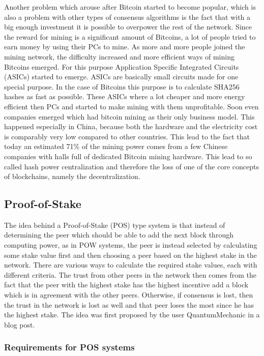 Another problem which arouse after Bitcoin started to become popular, which is also a problem with other types of consensus algorithms is the fact that with a big enough investment it is possible
to overpower the rest of the network. Since the reward for mining is a significant amount of Bitcoins, a lot of people tried to earn money by using their PCs to mine. As more and more people joined
the mining network, the difficulty increased and more efficient ways of mining Bitcoins emerged. For this purpose Application Specific Integrated Circuits (ASICs) started to emerge. ASICs are 
basically small circuits made for one special purpose. In the case of Bitcoins this purpose is to calculate SHA256 hashes as fast as possible.\cite{url:asic} These ASICs where a lot cheaper and more
energy efficient then PCs and started to make mining with them unprofitable.
Soon even companies emerged
which had bitcoin mining as their only business model. This happened especially in China, because both the hardware and the electricity cost is comparably very low compared to other countries. This lead
to the fact that today an estimated 71\% of the mining power comes from a few Chinese companies with halls full of dedicated Bitcoin mining hardware. 
This lead to so called hash power centralization and therefore the loss of
one of the core concepts of blockchains, namely the decentralization.\cite{url:btc_china}

\subsection{Proof-of-Stake}

The idea behind a Proof-of-Stake (POS) type system is that instead of determining the peer which should be able to add the next block through computing power, as in POW systems, the peer is instead
selected by calculating some stake value first and then choosing a peer based on the highest stake in the network. There are various ways to calculate the required stake values, each with different
criteria. The trust from other peers in the network then comes from the fact that the peer with the highest stake has the highest incentive add a block which is in agreement with the other peers.
Otherwise, if consensus is lost, then the trust in the network is lost as well and that peer loses the most since he has the highest stake. 
The idea was first proposed by the user QuantumMechanic in a blog post.\cite{url:pos}

\subsubsection{Requirements for POS systems}

